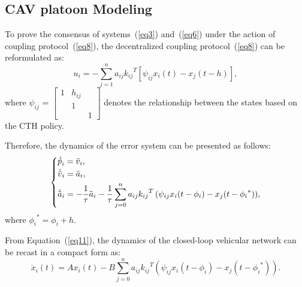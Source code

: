 \documentclass[a4paper]{cas-sc}
\begin{document}
\subsection{CAV platoon Modeling}
\label{Section 3.2}

To prove the consensus of systems~(\ref{eq3}) and~(\ref{eq6}) under the action of coupling protocol~(\ref{eq8}), the decentralized coupling protocol~(\ref{eq8}) can be reformulated as:
\begin{equation}
  {u_i} =  - \sum\limits_{j = 1}^n {{a_{ij}}{k_{ij}}^T\left[ {{\psi _{ij}}{x_i}(t) - {x_j}(t - h)} \right]} ,
  \label{eq10}
\end{equation}
where ${\psi _{ij}}{\text{ = }}\left[ {\begin{array}{*{20}{c}}
          1  & {{h_{ij}}} & {} \\
          {} & 1          & {} \\
          {} & {}         & 1
        \end{array}} \right]$ denotes the relationship between the states based on the CTH policy.

Therefore, the dynamics of the error system can be presented as follows:
\begin{equation}
  \left\{ \begin{gathered}
    {{\dot {\tilde p}}_i} = {{\tilde v}_i}, \hfill \\
    {{\dot {\tilde v}}_i} = {{\tilde a}_i}, \hfill \\
    {{\dot {\tilde a}}_i} =  - \frac{1}{\tau }{{\tilde a}_i} - \frac{1}{\tau }\sum\limits_{j = 0}^n {{a_{ij}}{k_{ij}}^T\left( {{\psi _{ij}}{x_i}(t - {\phi _i}) - {x_j}(t - {\phi _i}^*)} \right)},  \hfill \\
  \end{gathered}  \right.
  \label{eq11}
\end{equation}
where ${\phi_i}^\ast=\phi_i+h$.

From Equation~(\ref{eq11}), the dynamics of the closed-loop vehicular network can be recast in a compact form as:
\begin{equation}
  {\dot x_i}\left( t \right) = A{x_i}\left( t \right) - B\sum\limits_{j = 0}^n {{a_{ij}}{k_{ij}}^T\left( {{\psi _{ij}}{x_i}(t - {\phi _i}) - {x_j}(t - {\phi _i}^*)} \right)}.
  \label{eq12}
\end{equation}
\end{document}

